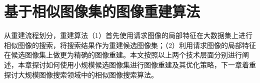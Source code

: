

\chapter{基于相似图像集的图像重建算法}

从重建流程划分，重建算法（1）首先使用请求图像的局部特征在大数据集上进行相似图像的搜索，将搜索结果作为重建候选图像集；（2）利用请求图像的局部特征在候选图像集上做更为精确的图像重建。本文按照以上两个技术层面分别进行阐述，本章探讨如何使用小规模候选图像集进行图像重建及其优化策略，下一章着重探讨大规模图像搜索领域中的相似图像搜索算法。




